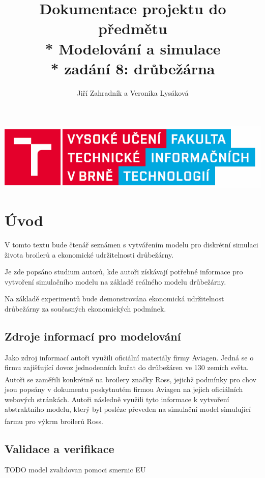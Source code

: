 \documentclass[a4paper,10pt]{article}
\title{Dokumentace projektu do předmětu \\* Modelování a simulace\\* zadání 8: drůbežárna}
\author{Jiří Zahradník a Veronika Lysáková}
\date{}
\begin{document}
\maketitle
\includegraphics[scale=0.5]{fitnewb.png}
\pagebreak

\renewcommand{\contentsname}{Obsah}
\tableofcontents


\renewcommand{\figurename}{Obrázek}


\pagebreak

%
%

\section{Úvod}
V tomto textu bude čtenář seznámen s vytvářením modelu pro diskrétní simulaci 
života broilerů a ekonomické udržitelnosti drůbežárny.
\par 
Je zde popsáno studium autorů, kde autoři získávají potřebné informace
pro vytvoření simulačního modelu na základě reálného modelu drůbežárny.
\par
Na základě experimentů bude demonstrována ekonomická udržitelnost
drůbežárny za současných ekonomických podmínek.

\subsection{Zdroje informací pro modelování\cite{modelovani}}\label{zdroje}
Jako zdroj informací autoři využili oficiální materiály firmy Aviagen\cite{aviagen}.
Jedná se o firmu zajišťující dovoz jednodenních kuřat do drůbežáren ve 130 zemích světa.
Autoři se zaměřili konkrétně na broilery značky Ross\textsuperscript{\textregistered},
jejichž podmínky pro chov jsou popsány v dokumentu poskytnutém firmou Aviagen\cite{ross}
na jejich oficiálních webových stránkách. Autoři následně využili tyto informace k
vytvoření abstraktního modelu\cite{abstract_model}, který byl posléze převeden na simulační model\cite{simulation_model}
simulující farmu pro výkrm broilerů Ross\textsuperscript{\textregistered}. 

\subsection{Validace a verifikace}\label{validaceVerifikace}
TODO model zvalidovan pomoci smernic EU
\end{document}
